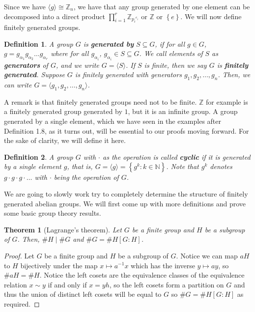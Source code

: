 \documentclass[letterpaper,12pt]{article}
\newcommand{\set}[1]{\left\{ #1 \right\}}
\newtheorem{theorem}{Theorem}[section]
\newtheorem{definition}{Definition}[section]
\begin{document}
Since we have $\langle g \rangle \cong \mathbb{Z}_n$, we have that any group generated by one element can be decomposed into a direct product $\prod_{i=1}^r \mathbb{Z}_{{p_i}^{e_i}}$ or $\mathbb{Z}$ or $\set{e}$. We will now define finitely generated groups. \begin{definition}
    A group $G$ is \textbf{generated by} $S\subseteq G$, if for all $g \in G$, $g = g_{\alpha_1}g_{\alpha_2}\ldots g_{\alpha_r}$ where for all $g_{\alpha_i}$, $g_{\alpha_i} \in S\subseteq G$. We call elements of $S$ as \textbf{generators} of $G$, and we write $G = \langle S \rangle$. If $S$ is finite, then we say $G$ is \textbf{finitely generated}. Suppose $G$ is finitely generated with generators $g_1,g_2,\ldots,g_n$. Then, we can write $G = \langle g_1,g_2,\ldots,g_n \rangle$.
\end{definition}
A remark is that finitely generated groups need not to be finite. $\mathbb{Z}$ for example is a finitely generated group generated by $1$, but it is an infinite group. A group generated by a single element, which we have seen in the examples after Definition 1.8, as it turns out, will be essential to our proofs moving forward. For the sake of clarity, we will define it here.
\begin{definition}
    A group $G$ with $\cdot$ as the operation is called \textbf{cyclic} if it is generated by a single element $g$, that is, $G = \langle g \rangle = \set{g^k : k \in \mathbb{N}}$. Note that $g^k$ denotes $g \cdot g \cdot g \cdot \ldots$ with $\cdot$ being the operation of $G$. 
\end{definition}
We are going to slowly work try to completely determine the structure of finitely generated abelian groups. We will first come up with more definitions and prove some basic group theory results.
 \begin{theorem}[Lagrange's theorem]
    Let $G$ be a finite group and $H$ be a subgroup of $G$. Then, $\# H \mid \# G$ and $\#G = \#H[G:H]$.
\end{theorem}
\begin{proof}
    Let $G$ be a finite group and $H$ be a subgroup of $G$. Notice we can map $aH$ to $H$ bijectively under the map $x \mapsto a^{-1}x$ which has the inverse $y \mapsto ay$, so $\# aH = \# H$. Notice the left cosets are the equivalence classes of the equivalence relation $x \sim y$ if and only if $x = yh$, so the left cosets form a partition on $G$ and thus the union of distinct left cosets will be equal to $G$ so $\#G = \#H[G:H]$ as required.
\end{proof}
\end{document}
